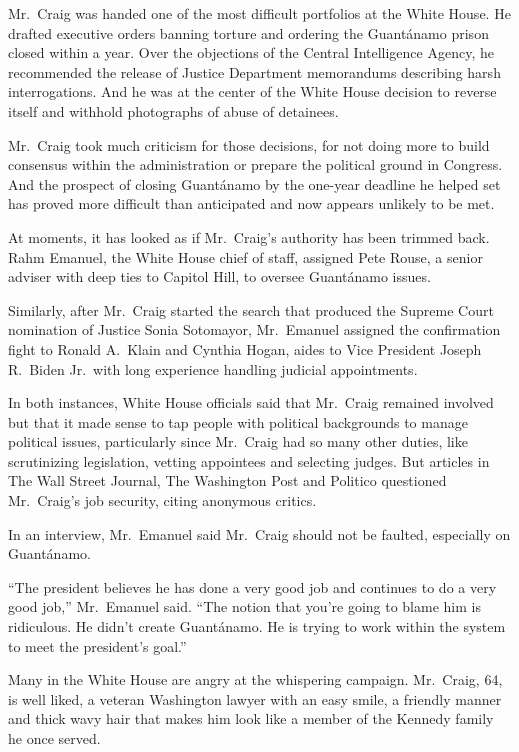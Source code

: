 ﻿\documentclass[12pt]{article}
\begin{document}
Mr.~Craig was handed one of the most difficult portfolios at the White House. He drafted executive
orders banning torture and ordering the Guant\'anamo prison closed within a year. Over the
objections of the Central Intelligence Agency, he recommended the release of Justice Department
memorandums describing harsh interrogations. And he was at the center of the White House decision to
reverse itself and withhold photographs of abuse of detainees.

Mr.~Craig took much criticism for those decisions, for not doing more to build consensus within the
administration or prepare the political ground in Congress. And the prospect of closing Guant\'anamo
by the one-year deadline he helped set has proved more difficult than anticipated and now appears
unlikely to be met.

At moments, it has looked as if Mr.~Craig's authority has been trimmed back. Rahm Emanuel, the White
House chief of staff, assigned Pete Rouse, a senior adviser with deep ties to Capitol Hill, to
oversee Guant\'anamo issues.

Similarly, after Mr.~Craig started the search that produced the Supreme Court nomination of Justice
Sonia Sotomayor, Mr.~Emanuel assigned the confirmation fight to Ronald A.~Klain and Cynthia Hogan,
aides to Vice President Joseph R.~Biden Jr.~with long experience handling judicial appointments.

In both instances, White House officials said that Mr.~Craig remained involved but that it made
sense to tap people with political backgrounds to manage political issues, particularly since
Mr.~Craig had so many other duties, like scrutinizing legislation, vetting appointees and selecting
judges. But articles in The Wall Street Journal, The Washington Post and Politico questioned
Mr.~Craig's job security, citing anonymous critics.

In an interview, Mr.~Emanuel said Mr.~Craig should not be faulted, especially on Guant\'anamo.

``The president believes he has done a very good job and continues to do a very good job,''
Mr.~Emanuel said. ``The notion that you're going to blame him is ridiculous. He didn't create
Guant\'anamo. He is trying to work within the system to meet the president's goal.''

Many in the White House are angry at the whispering campaign. Mr.~Craig, 64, is well liked, a
veteran Washington lawyer with an easy smile, a friendly manner and thick wavy hair that makes him
look like a member of the Kennedy family he once served.
\end{document}
